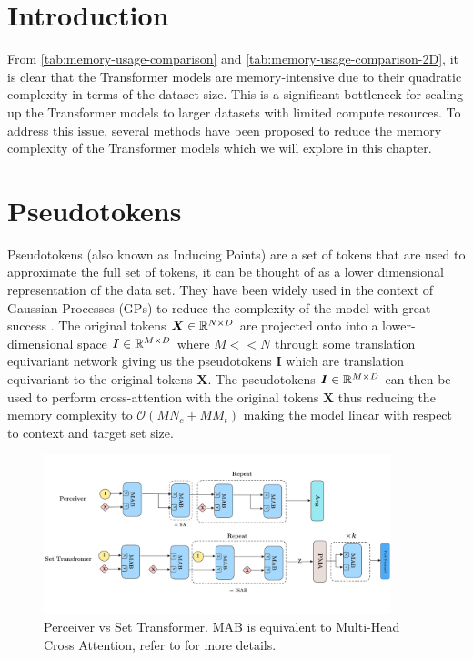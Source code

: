 \documentclass[../../main.tex]{subfiles}
\begin{document}
\section{Introduction}


From \autoref{tab:memory-usage-comparison} and \autoref{tab:memory-usage-comparison-2D}, it is clear that the Transformer models are memory-intensive due to their quadratic complexity in terms of the dataset size. This is a significant bottleneck for scaling up the Transformer models to larger datasets with limited compute resources. To address this issue, several methods have been proposed to reduce the memory complexity of the Transformer models which we will explore in this chapter.

\section{Pseudotokens}

Pseudotokens (also known as Inducing Points) are a set of tokens that are used to approximate the full set of tokens, it can be thought of as a lower dimensional representation of the data set. They have been widely used in the context of Gaussian Processes (GPs) to reduce the complexity of the model with great success \cite{hensman2013gaussian}. The original tokens $\bm{X} \in \mathbb{R}^{N \times D}$ are projected onto into a lower-dimensional space $\bm{I} \in \mathbb{R}^{M \times D}$ where $M << N$ through some translation equivariant network \cite{anonymous2024translationequivariant} giving us the pseudotokens $\bm{I}$ which are translation equivariant to the original tokens $\bm{X}$. The pseudotokens $\bm{I} \in \mathbb{R}^{M \times D}$ can then be used to perform cross-attention with the original tokens $\bm{X}$ thus reducing the memory complexity to $\mathcal{O}(MN_c + MM_t)$ making the model linear with respect to context and target set size. 



\begin{figure}[H]
    \centering
    \includegraphics[width=0.9\textwidth]{fig/set-transformer.png}
    \caption{Perceiver vs Set Transformer. MAB is equivalent to Multi-Head Cross Attention, refer to \cite{anonymous2024translationequivariant} for more details.}
    \label{fig:set-transformer}
\end{figure}
\end{document}

